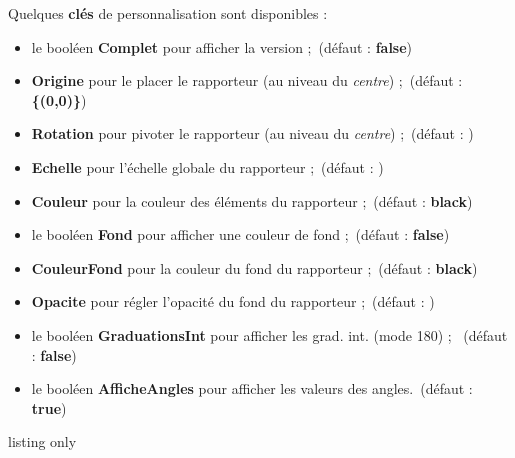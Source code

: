 \documentclass[french,a4paper,11pt]{article}
\newcommand\Cle[1]{{\bfseries\sffamily\textlangle #1\textrangle}}
\begin{document}
\begin{tipblock}
Quelques \Cle{clés} de personnalisation sont disponibles :

\begin{itemize}
	\item le booléen \Cle{Complet} pour afficher la version  \fg{};\hfill~(défaut : \Cle{false})
	\item \Cle{Origine} pour le placer le rapporteur (au niveau du \textit{centre}) ;\hfill~(défaut : \Cle{\{(0,0)\}})
	\item \Cle{Rotation} pour pivoter le rapporteur (au niveau du \textit{centre}) ;\hfill~(défaut : \Cle{0})
	\item \Cle{Echelle} pour l'échelle globale du rapporteur ;\hfill~(défaut : \Cle{1})
	\item \Cle{Couleur} pour la couleur des éléments du rapporteur ;\hfill~(défaut : \Cle{black})
	\item le booléen \Cle{Fond} pour afficher une couleur de fond ;\hfill~(défaut : \Cle{false})
	\item \Cle{CouleurFond} pour la couleur du fond du rapporteur ;\hfill~(défaut : \Cle{black})
	\item \Cle{Opacite} pour régler l'opacité du fond du rapporteur ;\hfill~(défaut : \Cle{0.5})
	\item le booléen \Cle{GraduationsInt} pour afficher les grad. int. (mode 180) ; \hfill~(défaut : \Cle{false})
	\item le booléen \Cle{AfficheAngles} pour afficher les valeurs des angles.\hfill~(défaut : \Cle{true})
\end{itemize}
\vspace*{-\baselineskip}\leavevmode
\end{tipblock}

\begin{PresentationCode}{listing only}
\tkzRapporteur[Fond,CouleurFond=purple,GraduationsInt]
\tkzRapporteur[Origine={(-2,-3)},Rotation=-45,Couleur=ForestGreen,Echelle=0.5]
\tkzRapporteur[Complet,Origine={(8,-3)},Rotation=30,Couleur=DarkBlue, Echelle=0.75]
\tkzRapporteur[Origine={(7,1)},Rotation=15,Couleur=orange, Echelle=0.75,AfficheAngles=false]
\tkzRapporteur[Complet,Origine={(8,-3)},Rotation=30,Couleur=DarkBlue, Echelle=0.75]
\tkzRapporteur[Complet,Origine={(2,-4)},Rotation=-90,Couleur=red, Echelle=0.5,AfficheAngles=false,Fond,CouleurFond=yellow]
\end{PresentationCode}
\end{document}
